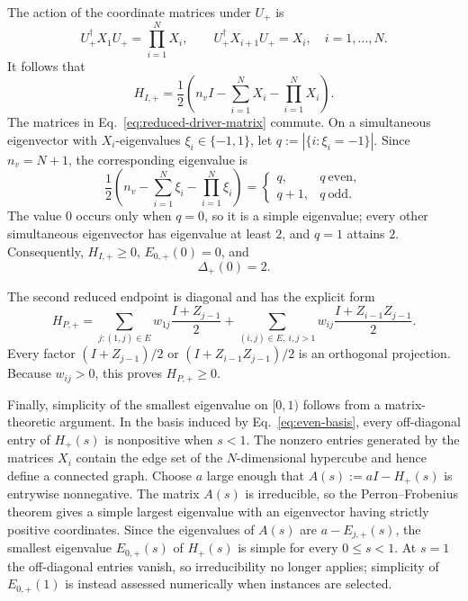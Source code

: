 \documentclass[11pt, a4paper]{article}
\begin{document}
The action of the coordinate matrices under $U_+$ is
\begin{equation}
U_+^\dagger X_1U_+=\prod_{i=1}^NX_i,
\qquad
U_+^\dagger X_{i+1}U_+=X_i,
\quad i=1,\ldots,N.
\end{equation}
It follows that
\begin{equation}
\label{eq:reduced-driver-matrix}
H_{I,+}=\frac12\left(n_vI-\sum_{i=1}^NX_i-\prod_{i=1}^NX_i\right).
\end{equation}
The matrices in Eq.~\eqref{eq:reduced-driver-matrix} commute. On a simultaneous eigenvector with $X_i$-eigenvalues $\xi_i\in\{-1,1\}$, let $q:=|\{i:\xi_i=-1\}|$. Since $n_v=N+1$, the corresponding eigenvalue is
\begin{equation}
\label{eq:reduced-driver-spectrum}
\frac12\left(n_v-\sum_{i=1}^N\xi_i-\prod_{i=1}^N\xi_i\right)
=\begin{cases}
q,&q\ \text{even},\\
q+1,&q\ \text{odd}.
\end{cases}
\end{equation}
The value $0$ occurs only when $q=0$, so it is a simple eigenvalue; every other simultaneous eigenvector has eigenvalue at least $2$, and $q=1$ attains $2$. Consequently, $H_{I,+}\ge0$, $E_{0,+}(0)=0$, and
\begin{equation}
\Delta_+(0)=2.
\end{equation}

The second reduced endpoint is diagonal and has the explicit form
\begin{equation}
\label{eq:reduced-problem-matrix}
H_{P,+}=\sum_{j:(1,j)\in E}w_{1j}\frac{I+Z_{j-1}}{2}
+\sum_{(i,j)\in E,\ i,j>1}w_{ij}\frac{I+Z_{i-1}Z_{j-1}}{2}.
\end{equation}
Every factor $(I+Z_{j-1})/2$ or $(I+Z_{i-1}Z_{j-1})/2$ is an orthogonal projection. Because $w_{ij}>0$, this proves $H_{P,+}\ge0$.

Finally, simplicity of the smallest eigenvalue on $[0,1)$ follows from a matrix-theoretic argument. In the basis induced by Eq.~\eqref{eq:even-basis}, every off-diagonal entry of $H_+(s)$ is nonpositive when $s<1$. The nonzero entries generated by the matrices $X_i$ contain the edge set of the $N$-dimensional hypercube and hence define a connected graph. Choose $a$ large enough that $A(s):=aI-H_+(s)$ is entrywise nonnegative. The matrix $A(s)$ is irreducible, so the Perron--Frobenius theorem gives a simple largest eigenvalue with an eigenvector having strictly positive coordinates. Since the eigenvalues of $A(s)$ are $a-E_{j,+}(s)$, the smallest eigenvalue $E_{0,+}(s)$ of $H_+(s)$ is simple for every $0\le s<1$. At $s=1$ the off-diagonal entries vanish, so irreducibility no longer applies; simplicity of $E_{0,+}(1)$ is instead assessed numerically when instances are selected.
\end{document}
